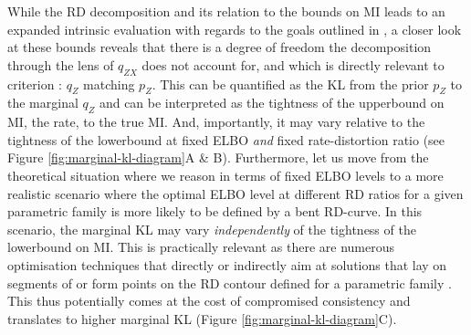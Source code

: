 While the RD decomposition and its relation to the bounds on MI leads to an expanded intrinsic evaluation with regards to the goals outlined in , a closer look at these bounds reveals that there is a degree of freedom the decomposition through the lens of $q_{ZX}$ does not account for, and which is directly relevant to criterion \enumthree: $q_Z$ matching $p_Z$. This can be quantified as the KL from the prior $p_Z$ to the marginal $q_Z$ \citep[a.k.a. \textit{marginal KL};][]{hoffman2016elbo} and can be interpreted as the tightness of the upperbound on MI, the rate, to the true MI. And, importantly, it may vary relative to the tightness of the lowerbound at fixed ELBO \textit{and} fixed rate-distortion ratio (see Figure \ref{fig:marginal-kl-diagram}A \& B).
Furthermore, let us move from the theoretical situation where we reason in terms of fixed ELBO levels to a more realistic scenario where the optimal ELBO level at different RD ratios for a given parametric family is more likely to be defined by a bent RD-curve. In this scenario, the marginal KL may vary \textit{independently} of the tightness of the lowerbound on MI. This is practically relevant as there are numerous optimisation techniques that directly or indirectly aim at solutions that lay on segments of or form points on the RD contour defined for a parametric family \citep[e.g. ][]{kingma2016improved, pelsmaeker2019effective, chen2016variational, alemi2018fixing}. This thus potentially comes at the cost of compromised consistency and translates to higher marginal KL (Figure \ref{fig:marginal-kl-diagram}C).
